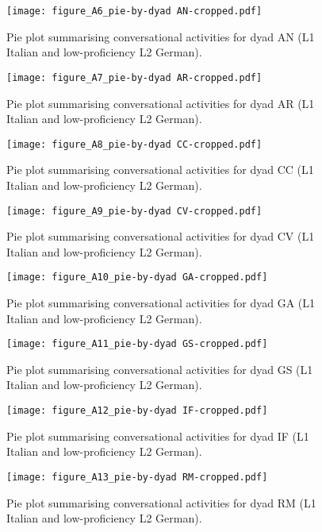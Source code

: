 \begin{figure}
\texttt{[image: figure\_A6\_pie-by-dyad AN-cropped.pdf]}
\caption{Pie plot summarising conversational activities for dyad AN (L1 Italian and low-proficiency L2 German).}
\label{fig:A6}
\end{figure}

\begin{figure}
\texttt{[image: figure\_A7\_pie-by-dyad AR-cropped.pdf]}
\caption{Pie plot summarising conversational activities for dyad AR (L1 Italian and low-proficiency L2 German).}
\label{fig:A7}
\end{figure}

\begin{figure}
\texttt{[image: figure\_A8\_pie-by-dyad CC-cropped.pdf]}
\caption{\label{fig:A8} Pie plot summarising conversational activities for dyad CC (L1 Italian and low-proficiency L2 German).}
\end{figure}

\begin{figure}
\texttt{[image: figure\_A9\_pie-by-dyad CV-cropped.pdf]}
\caption{\label{fig:A9} Pie plot summarising conversational activities for dyad CV (L1 Italian and low-proficiency L2 German).}
\end{figure}

\begin{figure}
\texttt{[image: figure\_A10\_pie-by-dyad GA-cropped.pdf]}
\caption{\label{fig:A10} Pie plot summarising conversational activities for dyad GA (L1 Italian and low-proficiency L2 German).}
\end{figure}

\begin{figure}
\texttt{[image: figure\_A11\_pie-by-dyad GS-cropped.pdf]}
\caption{\label{fig:A11} Pie plot summarising conversational activities for dyad GS (L1 Italian and low-proficiency L2 German).}
\end{figure}

\begin{figure}
\texttt{[image: figure\_A12\_pie-by-dyad IF-cropped.pdf]}
\caption{\label{fig:A12} Pie plot summarising conversational activities for dyad IF (L1 Italian and low-proficiency L2 German).}
\end{figure}

\begin{figure}
\texttt{[image: figure\_A13\_pie-by-dyad RM-cropped.pdf]}
\caption{\label{fig:A13} Pie plot summarising conversational activities for dyad RM (L1 Italian and low-proficiency L2 German).}
\end{figure}

